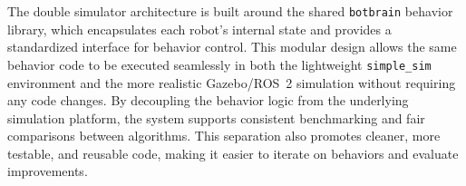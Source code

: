 The double simulator architecture is built around the shared \texttt{botbrain} behavior library, which encapsulates each robot’s internal state and provides a standardized interface for behavior control. This modular design allows the same behavior code to be executed seamlessly in both the lightweight \texttt{simple\_sim} environment and the more realistic Gazebo/ROS~2 simulation without requiring any code changes. By decoupling the behavior logic from the underlying simulation platform, the system supports consistent benchmarking and fair comparisons between algorithms. This separation also promotes cleaner, more testable, and reusable code, making it easier to iterate on behaviors and evaluate improvements.\\
